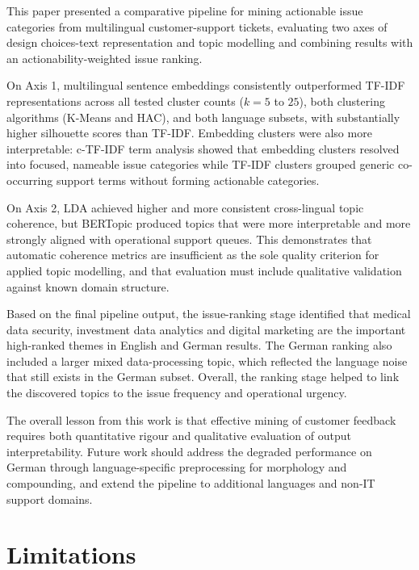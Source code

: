 \documentclass[11pt]{article}
\begin{document}
This paper presented a comparative pipeline for mining actionable issue categories from multilingual customer-support tickets, evaluating two axes of design choices-text representation and topic modelling and combining results with an actionability-weighted issue ranking.
 
On Axis 1, multilingual sentence embeddings consistently outperformed TF-IDF representations across all tested cluster counts ($k=5$ to $25$), both clustering algorithms (K-Means and HAC), and both language subsets, with substantially higher silhouette scores than TF-IDF. Embedding clusters were also more interpretable: c-TF-IDF term analysis showed that embedding clusters resolved into focused, nameable issue categories while TF-IDF clusters grouped generic co-occurring support terms without forming actionable categories.
 
On Axis 2, LDA achieved higher and more consistent cross-lingual topic coherence, but BERTopic produced topics that were more interpretable and more strongly aligned with operational support queues. This demonstrates that automatic coherence metrics are insufficient as the sole quality criterion for applied topic modelling, and that evaluation must include qualitative validation against known domain structure.
 
Based on the final pipeline output, the issue-ranking stage identified that medical data security, investment data analytics and digital marketing are the important high-ranked themes in English and German results. The German ranking also included a larger mixed data-processing topic, which reflected the language noise that still exists in the German subset. Overall, the ranking stage helped to link the discovered topics to the issue frequency and operational urgency.
 
The overall lesson from this work is that effective mining of customer feedback requires both quantitative rigour and qualitative evaluation of output interpretability. Future work should address the degraded performance on German through language-specific preprocessing for morphology and compounding, and extend the pipeline to additional languages and non-IT support domains.
 
\section*{Limitations}
 
\end{document}
